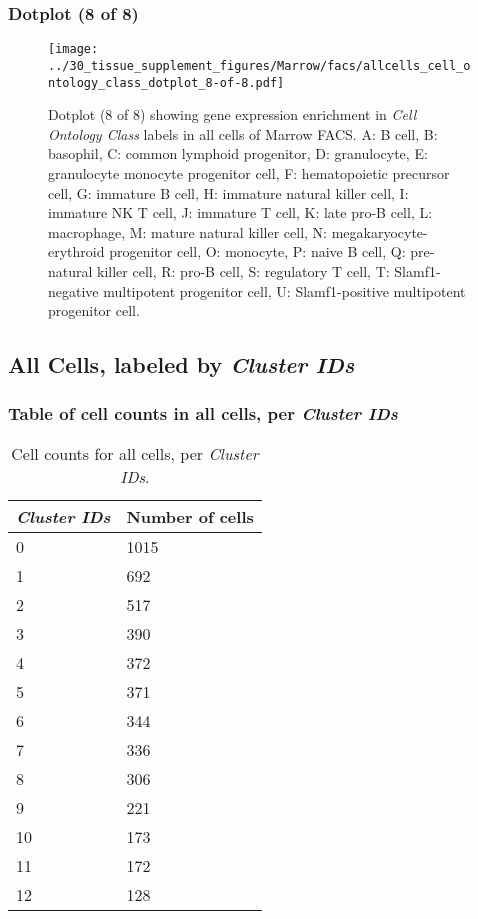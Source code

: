 \subsubsection{Dotplot (8 of 8)}
\begin{figure}[h]
\centering
\texttt{[image: ../30\_tissue\_supplement\_figures/Marrow/facs/allcells\_cell\_ontology\_class\_dotplot\_8-of-8.pdf]}

\caption{ Dotplot (8 of 8)  showing gene expression enrichment in \emph{Cell Ontology Class} labels in all cells of Marrow FACS. A: B cell, B: basophil, C: common lymphoid progenitor, D: granulocyte, E: granulocyte monocyte progenitor cell, F: hematopoietic precursor cell, G: immature B cell, H: immature natural killer cell, I: immature NK T cell, J: immature T cell, K: late pro-B cell, L: macrophage, M: mature natural killer cell, N: megakaryocyte-erythroid progenitor cell, O: monocyte, P: naive B cell, Q: pre-natural killer cell, R: pro-B cell, S: regulatory T cell, T: Slamf1-negative multipotent progenitor cell, U: Slamf1-positive multipotent progenitor cell.}
\end{figure}


\clearpage

\subsection{All Cells, labeled by \emph{Cluster IDs}}
\subsubsection{Table of cell counts in all cells, per \emph{Cluster IDs}}\begin{table}[h]
\centering
\label{my-label}
\begin{tabular}{@{}ll@{}}
\toprule

\emph{Cluster IDs}& Number of cells \\ \midrule
0 & 1015 \\

1 & 692 \\

2 & 517 \\

3 & 390 \\

4 & 372 \\

5 & 371 \\

6 & 344 \\

7 & 336 \\

8 & 306 \\

9 & 221 \\

10 & 173 \\

11 & 172 \\

12 & 128 \\
\bottomrule
\end{tabular}
\caption{Cell counts for all cells, per \emph{Cluster IDs}.}
\end{table}

